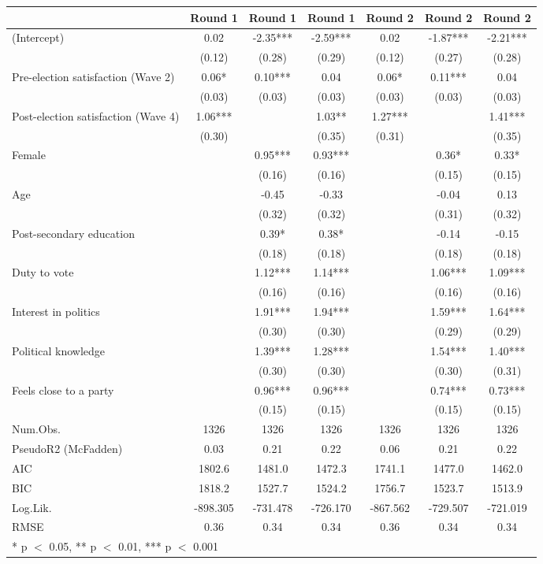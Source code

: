 \begin{table}
\centering
\begin{tabular}[t]{lcccccc}
\toprule
  & Round 1 & Round 1  & Round 1   & Round 2 & Round 2  & Round 2  \\
\midrule
(Intercept) & 0.02 & -2.35*** & -2.59*** & 0.02 & -1.87*** & -2.21***\\
 & (0.12) & (0.28) & (0.29) & (0.12) & (0.27) & (0.28)\\
Pre-election satisfaction (Wave 2) & 0.06* & 0.10*** & 0.04 & 0.06* & 0.11*** & 0.04\\
 & (0.03) & (0.03) & (0.03) & (0.03) & (0.03) & (0.03)\\
Post-election satisfaction (Wave 4) & 1.06*** &  & 1.03** & 1.27*** &  & 1.41***\\
 & (0.30) &  & (0.35) & (0.31) &  & (0.35)\\
Female &  & 0.95*** & 0.93*** &  & 0.36* & 0.33*\\
 &  & (0.16) & (0.16) &  & (0.15) & (0.15)\\
Age &  & -0.45 & -0.33 &  & -0.04 & 0.13\\
 &  & (0.32) & (0.32) &  & (0.31) & (0.32)\\
Post-secondary education &  & 0.39* & 0.38* &  & -0.14 & -0.15\\
 &  & (0.18) & (0.18) &  & (0.18) & (0.18)\\
Duty to vote &  & 1.12*** & 1.14*** &  & 1.06*** & 1.09***\\
 &  & (0.16) & (0.16) &  & (0.16) & (0.16)\\
Interest in politics &  & 1.91*** & 1.94*** &  & 1.59*** & 1.64***\\
 &  & (0.30) & (0.30) &  & (0.29) & (0.29)\\
Political knowledge &  & 1.39*** & 1.28*** &  & 1.54*** & 1.40***\\
 &  & (0.30) & (0.30) &  & (0.30) & (0.31)\\
Feels close to a party &  & 0.96*** & 0.96*** &  & 0.74*** & 0.73***\\
 &  & (0.15) & (0.15) &  & (0.15) & (0.15)\\
\midrule
Num.Obs. & 1326 & 1326 & 1326 & 1326 & 1326 & 1326\\
PseudoR2 (McFadden) & 0.03 & 0.21 & 0.22 & 0.06 & 0.21 & 0.22\\
AIC & 1802.6 & 1481.0 & 1472.3 & 1741.1 & 1477.0 & 1462.0\\
BIC & 1818.2 & 1527.7 & 1524.2 & 1756.7 & 1523.7 & 1513.9\\
Log.Lik. & -898.305 & -731.478 & -726.170 & -867.562 & -729.507 & -721.019\\
RMSE & 0.36 & 0.34 & 0.34 & 0.36 & 0.34 & 0.34\\
\bottomrule
\multicolumn{7}{l}{\rule{0pt}{1em}* p $<$ 0.05, ** p $<$ 0.01, *** p $<$ 0.001}\\
\end{tabular}
\end{table}
